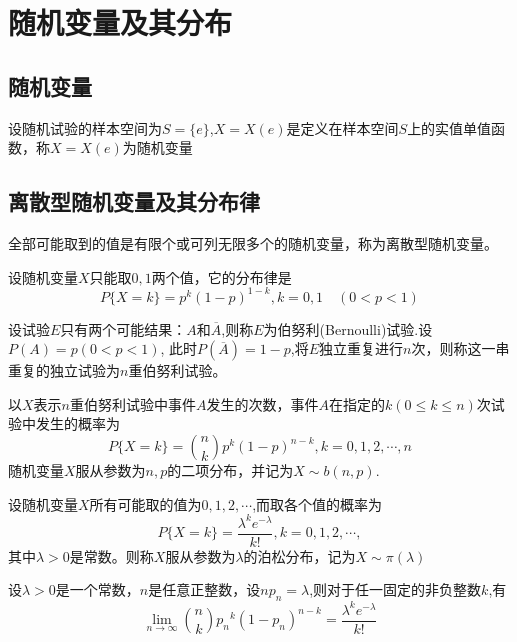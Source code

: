 \section{随机变量及其分布}

\subsection{随机变量}
\begin{definition}[随机变量]
  设随机试验的样本空间为$S=\{e\}$,$X=X(e)$是定义在样本空间$S$上的实值单值函数，称$X=X(e)$为随机变量
\end{definition}

\subsection{离散型随机变量及其分布律}
\begin{definition}[离散型随机变量]
    全部可能取到的值是有限个或可列无限多个的随机变量，称为离散型随机变量。
\end{definition}

\begin{definition}[($0-1$)分布]
    设随机变量$X$只能取$0,1$两个值，它的分布律是
    $$P\{X=k\}=p^k(1-p)^{1-k},k=0,1 \quad (0<p<1)$$
\end{definition}

\begin{definition}[伯努利试验]
    设试验$E$只有两个可能结果：$A$和$\overline{A} $,则称$E$为伯努利(Bernoulli)试验.设$P(A)=p(0<p<1)$,
    此时$P(\overline{A})=1-p$,将$E$独立重复进行$n$次，则称这一串重复的独立试验为$n$重伯努利试验。
\end{definition}

\begin{definition}[二项分布]
    以$X$表示$n$重伯努利试验中事件$A$发生的次数，事件$A$在指定的$k(0\leq k\leq n)$次试验中发生的概率为
    $$P\{X=k\}=\binom{n}{k}p^k(1-p)^{n-k},k=0,1,2,\cdots,n$$
    随机变量$X$服从参数为$n,p$的二项分布，并记为$X\sim b(n,p)$. 
\end{definition}

\begin{definition}[泊松分布]
    设随机变量$X$所有可能取的值为$0,1,2,\cdots$,而取各个值的概率为
    $$P\{X=k\}=\frac{\lambda^ke^{-\lambda}}{k!},k=0,1,2,\cdots,$$
    其中$\lambda>0$是常数。则称$X$服从参数为$\lambda$的泊松分布，记为$X\sim \pi(\lambda) $
\end{definition}

\begin{theorem}[泊松定理]
    设$\lambda>0$是一个常数，$n$是任意正整数，设$np_n=\lambda$,则对于任一固定的非负整数$k$,有
    $$\lim_{n \to \infty}\binom{n}{k}{p_n}^k(1-p_n)^{n-k}=\frac{\lambda^ke^{-\lambda}}{k!}$$   
\end{theorem}

